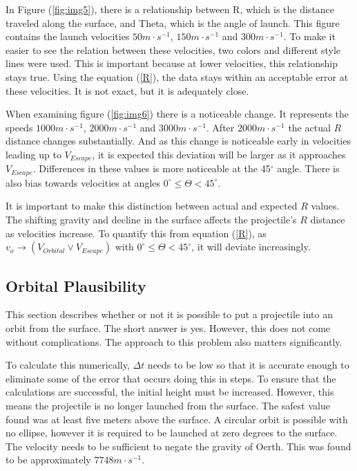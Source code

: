 \documentclass[12pt]{extarticle}
\begin{document}
In Figure (\ref{fig:img5}), there is a relationship between R, which is the distance traveled along the surface, and Theta, which is the angle of launch. This figure contains the launch velocities $50$$m \cdot s^{-1}$, $150$$m \cdot s^{-1}$ and $300$$m \cdot s^{-1}$. To make it easier to see the relation between these velocities, two colors and different style lines were used. This is important because at lower velocities, this relationship stays true. Using the equation (\ref{R}), the data stays within an acceptable error at these velocities. It is not exact, but it is adequately close.

When examining figure (\ref{fig:img6}) there is a noticeable change. It represents the speeds $1000$$m \cdot s^{-1}$, $2000$$m \cdot s^{-1}$ and $3000$$m \cdot s^{-1}$. After $2000$$m \cdot s^{-1}$ the actual $R$ distance changes substantially. And as this change is noticeable early in velocities leading up to $V_{Escape}$, it is expected this deviation will be larger as it approaches $V_{Escape}$. Differences in these values is more noticeable at the 45$^{\circ}$ angle. There is also bias towards velocities at angles $0^{\circ} \leq \varTheta < 45^{\circ}$.

It is important to make this distinction between actual and expected $R$ values. The shifting gravity and decline in the surface affects the projectile's $R$ distance as velocities increase. To quantify this from equation (\ref{R}), as $v_{o} \to (V_{Orbital} \lor V_{Escape})$ with $0^{\circ} \leq \varTheta < 45^{\circ}$, it will deviate increasingly.


\subsection{Orbital Plausibility}
This section describes whether or not it is possible to put a projectile into an orbit from the surface. The short answer is yes. However, this does not come without complications. The approach to this problem also matters significantly. 

To calculate this numerically, $\varDelta t$ needs to be low so that it is accurate enough to eliminate some of the error that occurs doing this in steps. To ensure that the calculations are successful, the initial height must be increased. However, this means the projectile is no longer launched from the surface. The safest value found was at least five meters above the surface. A circular orbit is possible with no ellipse, however it is required to be launched at zero degrees to the surface. The velocity needs to be sufficient to negate the gravity of Oerth. This was found to be approximately $7748 m\cdot s^{-1}$.
\end{document}
